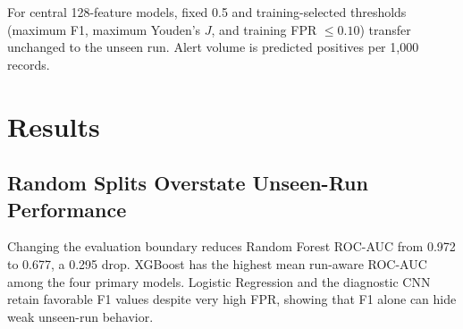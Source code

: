 \documentclass[conference]{IEEEtran}
\begin{document}
For central 128-feature models, fixed 0.5 and training-selected thresholds
(maximum F1, maximum Youden's $J$, and training FPR $\leq0.10$) transfer
unchanged to the unseen run. Alert volume is predicted positives per 1{,}000
records.

\FloatBarrier
\section{Results}

\subsection{Random Splits Overstate Unseen-Run Performance}

\begin{table}[H]
\caption{Baseline performance. Random-split values use a 70/30 split;
run-aware values are mean $\pm$ standard deviation across fifteen held-out
runs.}
\label{tab:baseline}
\centering
\scriptsize
{}
\end{table}

Changing the evaluation boundary reduces Random Forest ROC-AUC from 0.972 to
0.677, a 0.295 drop. XGBoost has the highest mean run-aware ROC-AUC among the
four primary models. Logistic Regression and the diagnostic CNN retain
favorable F1 values despite very high FPR, showing that F1 alone can hide weak
unseen-run behavior.
\end{document}
